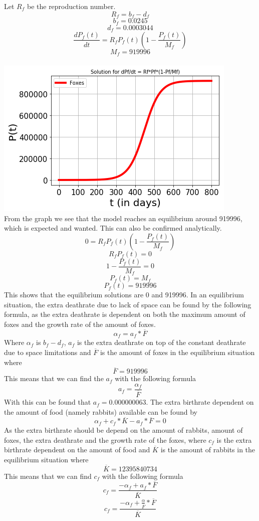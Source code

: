 \documentclass{article}
\begin{document}
Let $R_f$ be the reproduction number.
$$R_f = b_f - d_f$$
$$b_f = 0.0245$$
$$d_f = 0.0003044$$
$$\frac{dP_f(t)}{dt} = R_fP_f(t)(1-\frac{P_f(t)}{M_f})$$
$$M_f = 919996$$
\\
\includegraphics[scale=0.78]{Pictures/Foxes.png}
\\
From the graph we see that the model reaches an equilibrium around 919996, which is expected and wanted. This can also be confirmed analytically.
$$0=R_fP_f(t)(1-\frac{P_f(t)}{M_f})$$
$$R_fP_f(t)=0$$
$$1-\frac{P_f(t)}{M_f}=0$$
$$P_f(t)=M_f$$
$$P_f(t)=919996$$
This shows that the equilibrium solutions are 0 and 919996. In an equilibrium situation, the extra deathrate due to lack of space can be found by the following formula, as the extra deathrate is dependent on both the maximum amount of foxes and the growth rate of the amount of foxes.
$$\alpha_f = a_f * \overline{F}$$
Where $\alpha_f$ is $b_f-d_f$, $a_f$ is the extra deathrate on top of the constant deathrate due to space limitations and $\overline{F}$ is the amount of foxes in the equilibrium situation where
$$\overline{F} = 919996$$
This means that we can find the $a_f$ with the following formula
$$a_f = \frac{\alpha_f}{\overline{F}}$$
With this can be found that $a_f = 0.000000063$. The extra birthrate dependent on the amount of food (namely rabbits) available can be found by
$$\alpha_f + c_f*\overline{K}-a_f*\overline{F}=0$$
As the extra birthrate should be depend on the amount of rabbits, amount of foxes, the extra deathrate and the growth rate of the foxes, where $c_f$ is the extra birthrate dependent on the amount of food and $\overline{K}$ is the amount of rabbits in the equilibrium situation where
$$\overline{K}=12395840734$$
This means that we can find $c_f$ with the following formula
$$c_f=\frac{-\alpha_f+a_f*\overline{F}}{\overline{K}}$$
$$c_f=\frac{-\alpha_f+\frac{\alpha}{\overline{F}}*\overline{F}}{\overline{K}}$$
\end{document}
